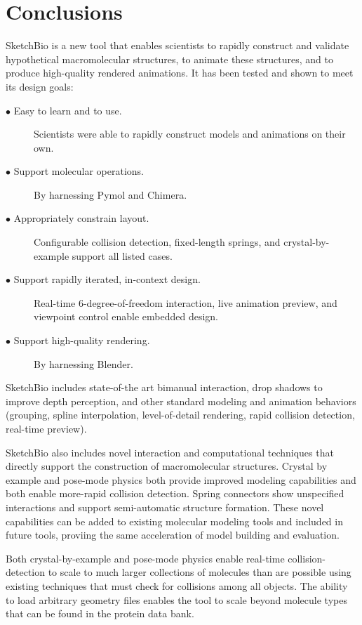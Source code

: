 \documentclass[twocolumn]{bmcart}%
\begin{document}
\section*{Conclusions}
SketchBio is a new tool that enables scientists to rapidly construct and validate hypothetical macromolecular structures, to animate these structures, and to produce high-quality rendered animations.
It has been tested and shown to meet its design goals:
\begin{description}
  \item[$\bullet$ Easy to learn and to use.] Scientists were able to rapidly construct models and animations on their own.
  \item[$\bullet$ Support molecular operations.] By harnessing Pymol and Chimera.
  \item[$\bullet$ Appropriately constrain layout.] Configurable collision detection, fixed-length springs, and crystal-by-example support all listed cases.
  \item[$\bullet$ Support rapidly iterated, in-context design.] Real-time 6-degree-of-freedom interaction, live animation preview, and viewpoint control enable embedded design.
  \item[$\bullet$ Support high-quality rendering.] By harnessing Blender.
\end{description}

SketchBio includes state-of-the art bimanual interaction, drop shadows to improve depth perception, and other standard modeling and animation behaviors (grouping, spline interpolation, level-of-detail rendering, rapid collision detection, real-time preview).

SketchBio also includes novel interaction and computational techniques that directly support the construction of macromolecular structures.
Crystal by example and pose-mode physics both provide improved modeling capabilities and both enable more-rapid collision detection.
Spring connectors show unspecified interactions and support semi-automatic structure formation.
These novel capabilities can be added to existing molecular modeling tools and included in future tools, proviing the same acceleration of model building and evaluation.

Both crystal-by-example and pose-mode physics enable real-time collision-detection to scale to much larger collections of molecules than are possible using existing techniques that must check for collisions among all objects. The ability to load arbitrary geometry files enables the tool to scale beyond molecule types that can be found in the protein data bank.
\end{document}
